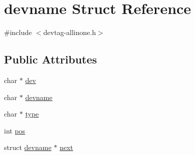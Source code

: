 \hypertarget{structdevname}{\section{devname \-Struct \-Reference}
\label{structdevname}
}


{\ttfamily \#include $<$devtag-\/allinone.\-h$>$}

\subsection*{\-Public \-Attributes}
\begin{DoxyCompactItemize}
\item 
char $\ast$ \hyperlink{structdevname_a0e6ec3e33e7e2011d5a18479f5f2f7af}{dev}
\item 
char $\ast$ \hyperlink{structdevname_ab5ff86fea47142f4d4035470ff433286}{devname}
\item 
char $\ast$ \hyperlink{structdevname_a45c535934a7a8190a782b53459cd9d8d}{type}
\item 
int \hyperlink{structdevname_a7e4d4bf0af752d11629ee1d862588e30}{pos}
\item 
struct \hyperlink{structdevname}{devname} $\ast$ \hyperlink{structdevname_aaf152858dc3b65ebef520ff7983d4012}{next}
\end{DoxyCompactItemize}


